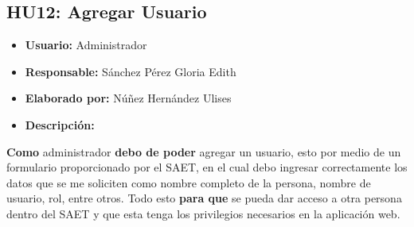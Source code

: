\subsection{HU12: Agregar Usuario}
\begin{itemize}
	\item \textbf{Usuario:} Administrador
	\item \textbf{Responsable:} Sánchez Pérez Gloria Edith
	\item \textbf{Elaborado por:} Núñez Hernández Ulises
	\item \textbf{Descripción:}
\end{itemize}
\textbf{Como} administrador \textbf{debo de poder} agregar un usuario, esto por medio de un formulario proporcionado por el SAET, en el cual debo ingresar correctamente los datos que se me soliciten como nombre completo de la persona, nombre de usuario, rol, entre otros. Todo esto \textbf{para que} se pueda dar acceso a otra persona dentro del SAET y que esta tenga los privilegios necesarios en la aplicación web.